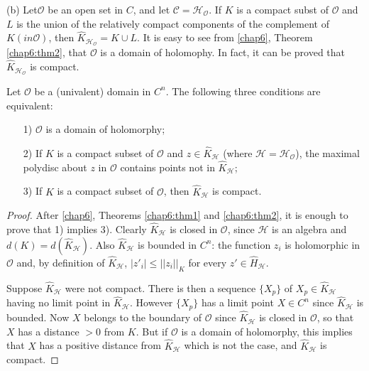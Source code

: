 \begin{examples*}
\medskip

(b) Let\pageoriginale $\mathscr{O}$ be an open set in $C$, and let
$\mathscr{C} = \mathscr{H}_{\mathscr{O}}$. If $K$ is a compact subst
of $\mathscr{O}$ and $L$ is the union of the relatively compact
components of the complement of $K(in \mathscr{O})$, then
$\hat{K}_{\mathscr{H}_{\mathscr{O}}} = K \cup L$. It is easy to see
from \ref{chap6}, Theorem \ref{chap6:thm2}, that $\mathscr{O}$ is a
domain of holomophy. In fact, it can be proved that
$\hat{K}_{\mathscr{H}_{\mathscr{O}}}$ is compact. 
\end{examples*}

\medskip
{}

\setcounter{proposition}{0}
\begin{proposition}%
Let $\mathscr{O}$ be a (univalent) domain in $C^n$. The following
three conditions are equivalent:
\begin{itemize}
\item[1)] $\mathscr{O}$ is a domain of holomorphy;

\item[2)] If $K$ is a compact subset of $\mathscr{O}$ and $z \in
  \hat{K}_{\mathscr{H}}$ (where $\mathscr{H} =
  \mathscr{H}_{\mathscr{O}}$), the maximal polydisc about $z$ in
  $\mathscr{O}$ contains points not in $\hat{K}_{\mathscr{H}}$;

\item[3)] If $K$ is a compact subset of $\mathscr{O}$, then
  $\hat{K}_{\mathscr{H}}$ is compact.
\end{itemize}
\end{proposition}

\begin{proof}
After \ref{chap6}, Theorems \ref{chap6:thm1} and \ref{chap6:thm2}, it
is enough to prove that 1) implies 
3). Clearly $\hat{K}_{\mathscr{H}}$ is closed in $\mathscr{O}$, since
$\mathscr{H}$ is an algebra and $d(K) =
d(\hat{K}_{\mathscr{H}})$. Also $\hat{K}_{\mathscr{H}}$ is bounded in
$C^n$: the function $z_i$ is holomorphic in $\mathscr{O}$ and, by
definition of $\hat{K}_{\mathscr{H}}$, $|z'_i| \leq ||z_i||_K$ for
every $z'\in \hat{H}_{\mathscr{H}}$. 

Suppose $\hat{K}_{\mathscr{H}}$ were not compact. There is then a
sequence $\{X_p\}$ of $X_p \in \hat{K}_{\mathscr{H}}$ having no limit
point in $\hat{K}_{\mathscr{H}}$. However $\{X_p\}$ has a limit point
$X \in C^n$ since $\hat{K}_{\mathscr{H}}$ is bounded. Now $X$ belongs
to the boundary of $\mathscr{O}$ since $\hat{K}_{\mathscr{H}}$ is
closed in $\mathscr{O}$, so that $X$ has a distance $>0$ from $K$. But
if $\mathscr{O}$ is a domain of holomorphy, this implies that $X$ has
a positive distance from $\hat{K}_{\mathscr{H}}$ which is not the
case, and $\hat{K}_{\mathscr{H}}$ is compact.
\end{proof}

